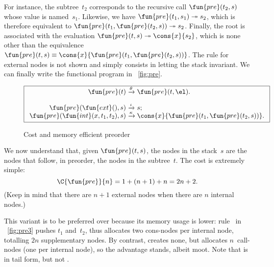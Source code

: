 For instance, the subtree~\(t_2\) corresponds to the recursive call
\(\fun{pre}(t_2,s)\) whose value is
named~\(s_1\). Likewise, we have \(\fun{pre}(t_1,s_1)
\twoheadrightarrow s_2\), which is therefore equivalent to
\(\fun{pre}(t_1,\fun{pre}(t_2,s)) \twoheadrightarrow s_2\). Finally,
the root is associated with the evaluation \(\fun{pre}(t,s)
\twoheadrightarrow \cons{x}{s_2}\), which is none other than the
equivalence \(\fun{pre}(t,s) \equiv
\cons{x}{\fun{pre}(t_1,\fun{pre}(t_2,s))}\).
The rule for external nodes is not shown and simply consists in
letting the stack invariant. We can finally write the functional
program in \fig~\vref{fig:pre}.
\begin{figure}[b]
\begin{equation*}
\boxed{
\begin{array}{r@{\;}c@{\;}l}
\fun{pre}(t) & \xrightarrow{\smash{\theta}} & \fun{pre}(t,\el).\\
\\
\fun{pre}(\fun{ext}(),s) & \xrightarrow{\smash{\iota}} & s;\\
\fun{pre}(\fun{int}(x,t_1,t_2),s)
  & \xrightarrow{\smash{\kappa}}
  & \cons{x}{\fun{pre}(t_1,\fun{pre}(t_2,s))}.
\end{array}}
\end{equation*}
\caption{Cost and memory efficient preorder}
\label{fig:pre}
\end{figure}

We now understand that, given \(\fun{pre}(t,s)\), the nodes in the
stack~\(s\) are the nodes that follow, in preorder, the nodes in the
subtree~\(t\). The cost is extremely simple:
\begin{equation}
\C{\fun{pre}}{n} = 1 + (n+1) + n = 2n+2.\label{eq:pre}
\index{pre@$\C{\fun{pre}}{n}$}
\end{equation}
(Keep in mind that there are \(n+1\) external nodes when there are
\(n\) internal nodes.)

This variant is to be preferred over
 because its
memory usage is lower: rule~\clause{\delta} in
\fig~\vref{fig:pre3} pushes \(t_1\) and~\(t_2\), thus allocates two
cons\hyp{}nodes per internal node, totalling \(2n\)
supplementary nodes. By contrast, 
creates none, but allocates \(n\)~call\hyp{}nodes
 (one per internal node), so the
advantage stands, albeit moot. Note that
 is in tail
form, but not .

